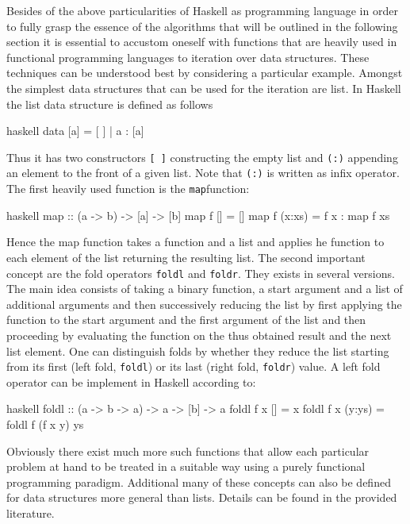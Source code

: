 \documentclass[a4paper,12pt, DIV=14, BCOR=5mm, twoside, headsepline]{scrbook}
\begin{document}
Besides of the above particularities of Haskell as programming language in order to fully grasp the essence of the algorithms that will be outlined in the following section it is essential to accustom oneself with functions that are heavily used in functional programming languages to iteration over data structures. These techniques can be understood best by considering a particular example. Amongst the simplest data structures that can be used for the iteration are list. In Haskell the list data structure is defined as follows 
\begin{center}
\begin{cminted}{haskell}
data [a] = [ ] | a : [a] 
\end{cminted}
\end{center}
Thus it has two constructors \texttt{[ ]} constructing the empty list and \texttt{(:)} appending an element to the front of a given list. Note that \texttt{(:)} is written as infix operator.
The first heavily used function is the \texttt{map}function:
\begin{center}
\begin{cminted}{haskell}
map :: (a -> b) -> [a] -> [b]
map f [] = [] 
map f (x:xs) =  f x : map f xs 
\end{cminted}
\end{center}
Hence the map function takes a function and a list and applies he function to each element of the list returning the resulting list. The second important concept are the fold operators \texttt{foldl} and \texttt{foldr}. They exists in several versions. The main idea consists of taking a binary function, a start argument and a list of additional arguments and then successively reducing the list by first applying the function to the start argument and the first argument of the list and then proceeding by evaluating the function on the thus obtained result and the next list element. One can distinguish folds by whether they reduce the list starting from its first (left fold, \texttt{foldl}) or its last (right fold, \texttt{foldr}) value. A left fold operator can be implement in Haskell according to:
\begin{center}
\begin{cminted}{haskell}
foldl :: (a -> b -> a) -> a -> [b] -> a 
foldl f x [] = x 
foldl f x (y:ys) = foldl f (f x y) ys
\end{cminted}
\end{center}
Obviously there exist much more such functions that allow each particular problem at hand to be treated in a suitable way using a purely functional programming paradigm. Additional many of these concepts can also be defined for data structures more general than lists. Details can be found in the provided literature.
\end{document}

